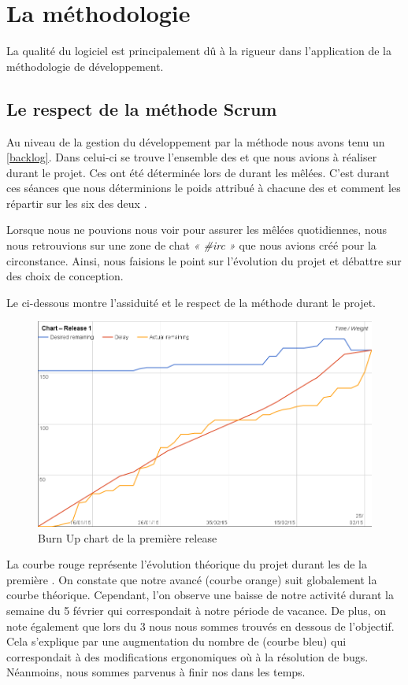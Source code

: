 \section{La méthodologie}

La qualité du logiciel \FactDev{} est principalement dû à la rigueur dans l'application de la méthodologie de développement.

\subsection{Le respect de la méthode Scrum}
Au niveau de la gestion du développement par la méthode \Scrum{} nous avons tenu un \Backlog{} \ref{backlog}. Dans celui-ci se trouve l'ensemble des \UserStories{} et\TechnicalStories{} que nous avions à réaliser durant le projet. Ces \Stories{} ont été déterminée lors de \PlanningPoker durant les mêlées. C'est durant ces séances que nous déterminions le poids attribué à chacune des \Stories{} et comment les répartir sur les six \Sprints{} des deux \Releases.  

Lorsque nous ne pouvions nous voir pour assurer les mêlées quotidiennes, nous nous retrouvions sur une zone  de chat \textit{« \#irc »} que nous avions créé pour la circonstance. Ainsi, nous faisions le point sur l'évolution du projet et débattre sur des choix de conception.

Le \BurnUp{} ci-dessous montre l'assiduité et le respect de la méthode \Scrum{} durant le projet. 
\begin{figure}[H]
	\centering
	\includegraphics[width=0.7\linewidth]{screens/release1-chart.png}
	\caption{Burn Up chart de la première release}
	\label{fig:burnupchart-release1}
\end{figure}
La courbe rouge représente l'évolution théorique du projet durant les \Sprints{} de la première \Release. On constate que notre avancé (courbe orange)  suit globalement la courbe théorique. Cependant, l'on observe une baisse de notre activité durant la semaine du 5 février qui correspondait à notre période de vacance. De plus, on note également que lors du \Sprint{} 3 nous nous sommes trouvés en dessous de l'objectif. Cela s'explique par une augmentation du nombre de \Stories{} (courbe bleu) qui correspondait à des modifications ergonomiques où à la résolution de bugs. Néanmoins, nous sommes parvenus à finir nos \Sprints{} dans les temps. 

